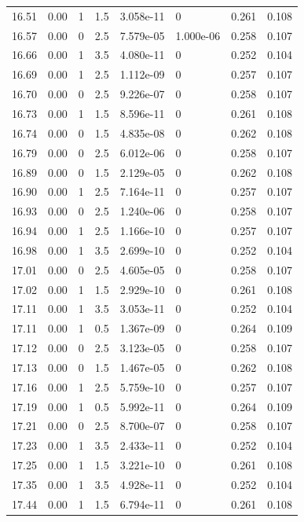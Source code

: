 \documentclass[preview]{standalone}
\begin{document}
{{{{{{{{{{{{{\begin{tabular}{L{1.2cm}C{1.2cm} C{0.3cm}C{0.5cm} C{1.4cm}C{1.4cm} C{1.4cm}C{1.4cm}}
  16.51  &  0.00  & 1     & 1.5 &  3.058e-11  & 0  & 0.261 &  0.108   \\ 
  16.57  &  0.00  & 0     & 2.5 &  7.579e-05  & 1.000e-06  & 0.258 &  0.107   \\ 
  16.66  &  0.00  & 1     & 3.5 &  4.080e-11  & 0  & 0.252 &  0.104   \\ 
  16.69  &  0.00  & 1     & 2.5 &  1.112e-09  & 0  & 0.257 &  0.107   \\ 
  16.70  &  0.00  & 0     & 2.5 &  9.226e-07  & 0  & 0.258 &  0.107   \\ 
  16.73  &  0.00  & 1     & 1.5 &  8.596e-11  & 0  & 0.261 &  0.108   \\ 
  16.74  &  0.00  & 0     & 1.5 &  4.835e-08  & 0  & 0.262 &  0.108   \\ 
  16.79  &  0.00  & 0     & 2.5 &  6.012e-06  & 0  & 0.258 &  0.107   \\ 
  16.89  &  0.00  & 0     & 1.5 &  2.129e-05  & 0  & 0.262 &  0.108   \\ 
  16.90  &  0.00  & 1     & 2.5 &  7.164e-11  & 0  & 0.257 &  0.107   \\ 
  16.93  &  0.00  & 0     & 2.5 &  1.240e-06  & 0  & 0.258 &  0.107   \\ 
  16.94  &  0.00  & 1     & 2.5 &  1.166e-10  & 0  & 0.257 &  0.107   \\ 
  16.98  &  0.00  & 1     & 3.5 &  2.699e-10  & 0  & 0.252 &  0.104   \\ 
  17.01  &  0.00  & 0     & 2.5 &  4.605e-05  & 0  & 0.258 &  0.107   \\ 
  17.02  &  0.00  & 1     & 1.5 &  2.929e-10  & 0  & 0.261 &  0.108   \\ 
  17.11  &  0.00  & 1     & 3.5 &  3.053e-11  & 0  & 0.252 &  0.104   \\ 
  17.11  &  0.00  & 1     & 0.5 &  1.367e-09  & 0  & 0.264 &  0.109   \\ 
  17.12  &  0.00  & 0     & 2.5 &  3.123e-05  & 0  & 0.258 &  0.107   \\ 
  17.13  &  0.00  & 0     & 1.5 &  1.467e-05  & 0  & 0.262 &  0.108   \\ 
  17.16  &  0.00  & 1     & 2.5 &  5.759e-10  & 0  & 0.257 &  0.107   \\ 
  17.19  &  0.00  & 1     & 0.5 &  5.992e-11  & 0  & 0.264 &  0.109   \\ 
  17.21  &  0.00  & 0     & 2.5 &  8.700e-07  & 0  & 0.258 &  0.107   \\ 
  17.23  &  0.00  & 1     & 3.5 &  2.433e-11  & 0  & 0.252 &  0.104   \\ 
  17.25  &  0.00  & 1     & 1.5 &  3.221e-10  & 0  & 0.261 &  0.108   \\ 
  17.35  &  0.00  & 1     & 3.5 &  4.928e-11  & 0  & 0.252 &  0.104   \\ 
  17.44  &  0.00  & 1     & 1.5 &  6.794e-11  & 0  & 0.261 &  0.108   \\ 
\hline 
\end{tabular} 

}}}}}}}}}}}}}
\end{document}
